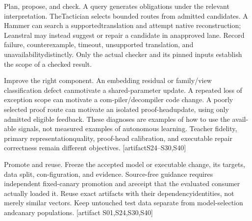 \noindent
Plan, propose, and check. A query generates obligations under the relevant interpretation. The\linebreak[4]
Tactician selects bounded routes from admitted candidates. A Hammer can search a supported\linebreak[4]
translation and attempt native reconstruction; Leanstral may instead suggest or repair a candidate in an\linebreak[4]
approved lane. Record failure, counterexample, timeout, unsupported translation, and unavailability\linebreak[4]
distinctly. Only the actual checker and its pinned inputs establish the scope of a checked result.\linebreak[4]
[artifact S37--S39]\par

\noindent
Improve the right component. An embedding residual or family/view classification defect can\linebreak[4]
motivate a shared-parameter update. A repeated loss of exception scope can motivate a com-\linebreak[4]
piler/decompiler code change. A poorly selected proof route can motivate an isolated proof-head\linebreak[4]
update, using only admitted eligible feedback. These diagnoses are examples of how to use the avail-\linebreak[4]
able signals, not measured examples of autonomous learning. Teacher fidelity, primary representation\linebreak[4]
quality, proof-head calibration, and executable repair correctness remain different objectives. [artifact\linebreak[4]
S24--S30,S40]\par

\noindent
Promote and reuse. Freeze the accepted model or executable change, its targets, data split, con-\linebreak[4]
figuration, and evidence. Source-free guidance requires independent fixed-canary promotion and a\linebreak[4]
receipt that the evaluated consumer actually loaded it. Reuse exact artifacts with their dependency\linebreak[4]
identities, not merely similar vectors. Keep untouched test data separate from model-selection and\linebreak[4]
canary populations. [artifact S01,S24,S30,S40]\par

